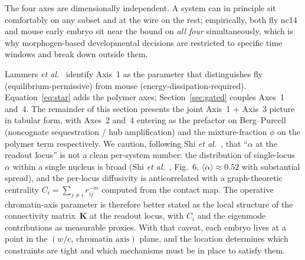 \documentclass[11pt]{article}
\begin{document}
The four axes are dimensionally independent. A system can in principle
sit comfortably on any subset and at the wire on the rest; empirically,
both fly nc14 and mouse early embryo sit near the bound on \emph{all
four} simultaneously, which is why morphogen-based developmental
decisions are restricted to specific time windows and break down
outside them.

Lammers \textit{et al.}~\cite{Lammers2023} identify Axis~1 as the
parameter that distinguishes fly (equilibrium-permissive) from mouse
(energy-dissipation-required). Equation~\eqref{eq:star} adds the polymer
axes; Section~\ref{sec:gated} couples Axes~1 and~4. The remainder of this
section presents the joint Axis~1 + Axis~3 picture in tabular form,
with Axes~2 and~4 entering as the prefactor on Berg--Purcell
(noncognate sequestration / hub amplification) and the mixture-fraction
$\phi$ on the polymer term respectively. We caution, following Shi
\textit{et al.}~\cite{Shi2025}, that ``$\alpha$ at the readout locus'' is
not a clean per-system number: the distribution of single-locus~$\alpha$
within a single nucleus is broad (Shi
\textit{et al.}~\cite{Shi2025}, Fig.~6, $\langle\alpha\rangle\approx 0.52$
with substantial spread), and the per-locus diffusivity is anticorrelated
with a graph-theoretic centrality $C_i = \sum_{j\neq i} r_{ij}^{-m}$
computed from the contact map. The operative chromatin-axis parameter is
therefore better stated as the local structure of the connectivity
matrix~$\mathbf{K}$ at the readout locus, with $C_i$ and the eigenmode
contributions as measurable proxies. With that caveat, each embryo lives
at a point in the $(w/c,\,\text{chromatin axis})$ plane, and the location
determines which constraints are tight and which mechanisms must be in
place to satisfy them.
\end{document}
